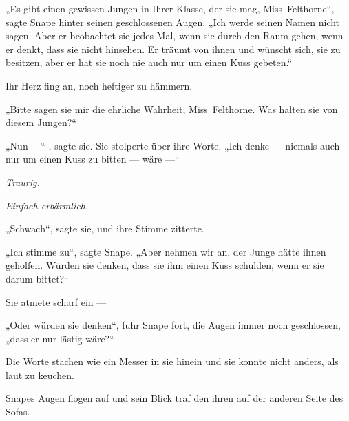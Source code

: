 „Es gibt einen gewissen Jungen in Ihrer Klasse, der sie mag, Miss~Felthorne“, sagte Snape hinter seinen geschlossenen Augen.
„Ich werde seinen Namen nicht sagen. Aber er beobachtet sie jedes Mal, wenn sie durch den Raum gehen, wenn er denkt, dass sie nicht hinsehen. Er träumt von ihnen und wünscht sich, sie zu besitzen, aber er hat sie noch nie auch nur um einen Kuss gebeten.“

Ihr Herz fing an, noch heftiger zu hämmern.

„Bitte sagen sie mir die ehrliche Wahrheit, Miss~Felthorne. Was halten sie von diesem Jungen?“

„Nun —“ , sagte sie. Sie stolperte über ihre Worte.
„Ich denke — niemals auch nur um einen Kuss zu bitten — wäre —“

\emph{Traurig.}

\emph{Einfach erbärmlich.}

„Schwach“, sagte sie, und ihre Stimme zitterte.

„Ich stimme zu“, sagte Snape.
„Aber nehmen wir an, der Junge hätte ihnen geholfen. Würden sie denken, dass sie ihm einen Kuss schulden, wenn er sie darum bittet?“

Sie atmete scharf ein —

„Oder würden sie denken“, fuhr Snape fort, die Augen immer noch geschlossen, „dass er nur lästig wäre?“

Die Worte stachen wie ein Messer in sie hinein und sie konnte nicht anders, als laut zu keuchen.

Snapes Augen flogen auf und sein Blick traf den ihren auf der anderen Seite des Sofas.

